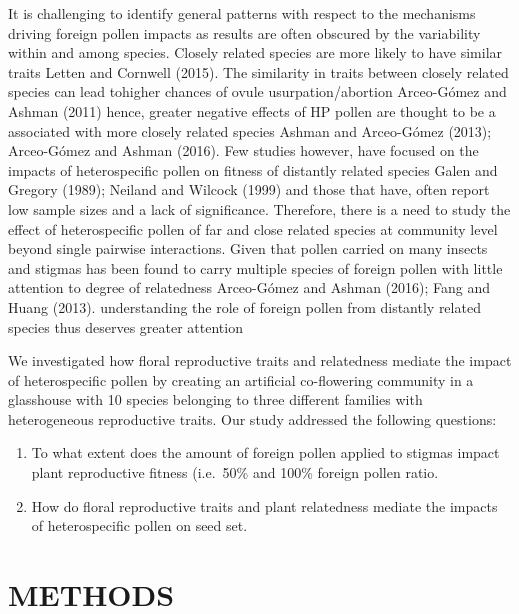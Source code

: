 \documentclass[11pt,a4paper]{article}
\begin{document}
It is challenging to identify general patterns with respect to the
mechanisms driving foreign pollen impacts as results are often obscured
by the variability within and among species. Closely related species are
more likely to have similar traits Letten and Cornwell (2015). The
similarity in traits between closely related species can lead tohigher
chances of ovule usurpation/abortion Arceo-Gómez and Ashman (2011)
hence, greater negative effects of HP pollen are thought to be a
associated with more closely related species Ashman and Arceo-Gómez
(2013); Arceo-Gómez and Ashman (2016). Few studies however, have focused
on the impacts of heterospecific pollen on fitness of distantly related
species Galen and Gregory (1989); Neiland and Wilcock (1999) and those
that have, often report low sample sizes and a lack of significance.
Therefore, there is a need to study the effect of heterospecific pollen
of far and close related species at community level beyond single
pairwise interactions. Given that pollen carried on many insects and
stigmas has been found to carry multiple species of foreign pollen with
little attention to degree of relatedness Arceo-Gómez and Ashman (2016);
Fang and Huang (2013). understanding the role of foreign pollen from
distantly related species thus deserves greater attention

We investigated how floral reproductive traits and relatedness mediate
the impact of heterospecific pollen by creating an artificial
co-flowering community in a glasshouse with 10 species belonging to
three different families with heterogeneous reproductive traits. Our
study addressed the following questions:

\begin{enumerate}
\def\labelenumi{\arabic{enumi}.}
\item
  To what extent does the amount of foreign pollen applied to stigmas
  impact plant reproductive fitness (i.e.~50\% and 100\% foreign pollen
  ratio.
\item
  How do floral reproductive traits and plant relatedness mediate the
  impacts of heterospecific pollen on seed set.
\end{enumerate}

\section{METHODS}\label{methods}
\end{document}

